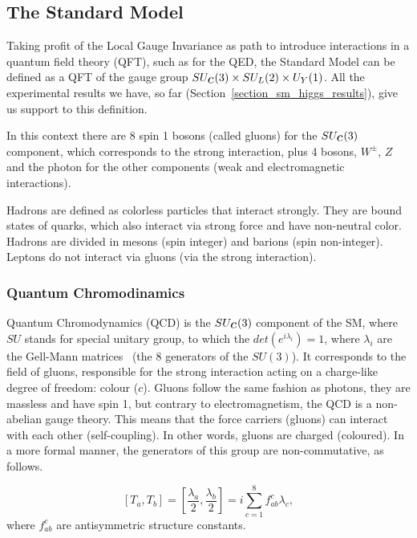 \subsection{The Standard Model}

Taking profit of the Local Gauge Invariance as path to introduce interactions in a quantum field theory (QFT), such as for the QED, the Standard Model can be defined as a QFT of the gauge group $SU_{\scaleto{c}{5pt}}(3) \times SU_{\scaleto{L}{5pt}}(2) \times U_{\scaleto{Y}{5pt}}(1)$. All the experimental results we have, so far (Section~\ref{section_sm_higgs_results}), give us support to this definition. 

In this context there are 8 spin 1 bosons (called gluons) for the $SU_{\scaleto{c}{5pt}}(3)$ component, which corresponds to the strong interaction, plus 4 bosons, $W^\pm$, $Z$ and the photon for the other components (weak and electromagnetic interactions).

Hadrons are defined as colorless particles that interact strongly. They are bound states of quarks, which also interact via strong force and have non-neutral color. Hadrons are divided in mesons (spin integer) and barions (spin non-integer). Leptons do not interact via gluons (via the strong interaction).

\subsubsection{Quantum Chromodinamics}

Quantum Chromodynamics (QCD) is the $SU_{\scaleto{c}{5pt}}(3)$ component of the SM, where $SU$ stands for special unitary group, to which the $det(e^{i\lambda_i}) = 1$, where $\lambda_i$ are the Gell-Mann matrices~\cite{PhysRev.125.1067} (the 8 generators of the $SU(3)$). It corresponds to the field of gluons, responsible for the strong interaction acting on a charge-like degree of freedom: colour ($c$). Gluons follow the same fashion as photons, they are massless and have spin 1, but contrary to electromagnetism, the QCD is a non-abelian gauge theory. This means that the force carriers (gluons) can interact with each other (self-coupling). In other words, gluons are charged (coloured). In a more formal manner, the generators of this group are non-commutative, as follows.

\begin{equation}
    \left[ T_a, T_b \right] = \left[ \frac{\lambda_a}{2}, \frac{\lambda_b}{2} \right] = i \sum_{c=1}^8 f_{ab}^c\lambda_c,
\label{qcd_commutators}
\end{equation}
where $f_{ab}^c$ are antisymmetric structure constants.

